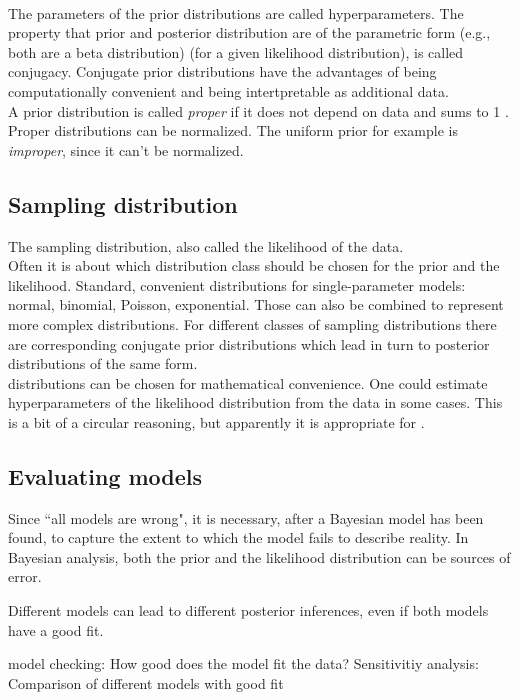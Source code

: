 \documentclass{article}
\begin{document}
\\
The parameters of the prior distributions are called hyperparameters. The property that prior and posterior distribution are of the parametric form (e.g., both are a beta distribution) (for a given likelihood distribution), is called conjugacy. Conjugate prior distributions have the advantages of being computationally convenient and being intertpretable as additional data.
\\
A prior distribution is called \textit{proper} if it does not depend on data and sums to 1 \cite{1439840954}. Proper distributions can be normalized. The uniform prior for example is \textit{improper}, since it can't be normalized.

\subsection{Sampling distribution}
\label{Sampling distribution}

The sampling distribution, also called the likelihood of the data.
\\
Often it is about which distribution class should be chosen for the prior and the likelihood. Standard, convenient distributions for single-parameter models: normal, binomial, Poisson, exponential. Those can also be combined to represent more complex distributions. For different classes of sampling distributions there are corresponding conjugate prior distributions which lead in turn to posterior distributions of the same form. \cite{1439840954}
\\
distributions can be chosen for mathematical convenience. One could estimate hyperparameters of the likelihood distribution from the data in some cases. This is a bit of a circular reasoning, but apparently  it is appropriate for \cite{1439840954}.

\subsection{Evaluating models}

Since ``all models are wrong", it is necessary, after a Bayesian model has been found, to capture the extent to which the model fails to describe reality. In Bayesian analysis, both the prior and the likelihood distribution can be sources of error.

Different models can lead to different posterior inferences, even if both models have a good fit.

model checking: How good does the model fit the data?
Sensitivitiy analysis: Comparison of different models with good fit
\end{document}
